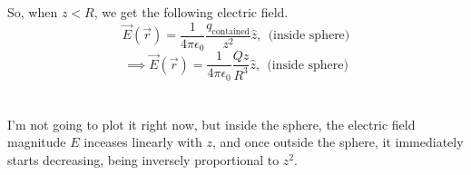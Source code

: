 \documentclass[12pt]{article}
\begin{document}
\begin{flushleft}
So, when $z<R$, we get the following electric field.
$$\vec{E}(\vec{r})=\frac{1}{4\pi\epsilon_0}\frac{q_\text{contained}}{z^2}\hat{z},\ \ \text{(inside sphere)}$$
$$\implies\vec{E}(\vec{r})=\frac{1}{4\pi\epsilon_0}\frac{Qz}{R^3}\hat{z},\ \ \text{(inside sphere)}$$\\~\\

I'm not going to plot it right now, but inside the sphere, the electric field magnitude $E$ inceases linearly with $z$, and once outside the sphere, it immediately starts decreasing, being inversely proportional to $z^2$.


\end{flushleft}
\end{document}
